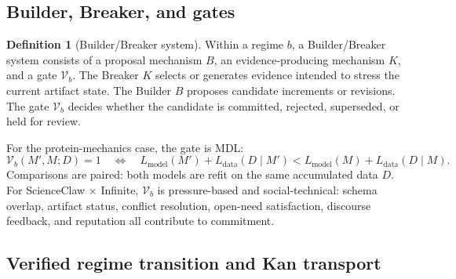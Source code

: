 \documentclass[11pt]{article}
\theoremstyle{definition}
\newtheorem{definition}{Definition}
\newcommand{\V}{\mathcal{V}}
\begin{document}
\subsection{Builder, Breaker, and gates}

\begin{definition}[Builder/Breaker system]
\label{def:bb}
Within a regime $b$, a Builder/Breaker system consists of a proposal mechanism $B$, an evidence-producing mechanism $K$, and a gate $\V_b$. The Breaker $K$ selects or generates evidence intended to stress the current artifact state. The Builder $B$ proposes candidate increments or revisions. The gate $\V_b$ decides whether the candidate is committed, rejected, superseded, or held for review.
\end{definition}

For the protein-mechanics case, the gate is MDL:
\begin{equation}
\V_b(M',M;D)=1
\quad\Longleftrightarrow\quad
L_{\mathrm{model}}(M')+L_{\mathrm{data}}(D\mid M')
<
L_{\mathrm{model}}(M)+L_{\mathrm{data}}(D\mid M).
\label{eq:mdl_methods}
\end{equation}
Comparisons are paired: both models are refit on the same accumulated data $D$. For ScienceClaw $\times$ Infinite, $\V_b$ is pressure-based and social-technical: schema overlap, artifact status, conflict resolution, open-need satisfaction, discourse feedback, and reputation all contribute to commitment.

\subsection{Verified regime transition and Kan transport}
\end{document}

